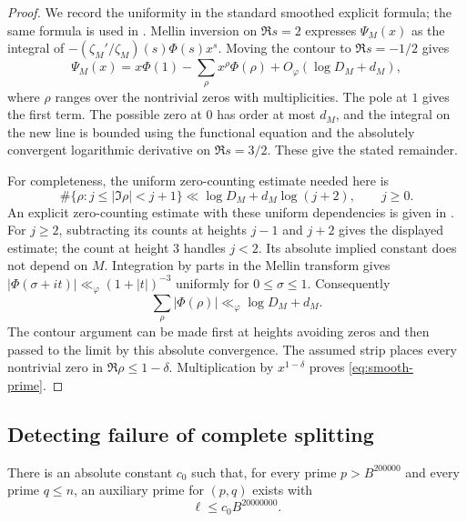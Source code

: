 \begin{proof}
We record the uniformity in the standard smoothed explicit formula;
the same formula is used in
\cite[Section~9.2, Equation~(9.9)]{OpenAIPrimitive26}.
Mellin inversion on $\Re s=2$ expresses $\Psi_M(x)$ as the integral
of $-(\zeta_M'/\zeta_M)(s)\Phi(s)x^s$. Moving the contour to
$\Re s=-1/2$ gives
\[
 \Psi_M(x)=x\Phi(1)-\sum_\rho x^\rho\Phi(\rho)
       +O_\varphi(\log D_M+d_M),
\]
where $\rho$ ranges over the nontrivial zeros with multiplicities.
The pole at $1$ gives the first term. The possible zero at $0$ has
order at most $d_M$, and the integral on the new line is bounded using
the functional equation and the absolutely convergent logarithmic
derivative on $\Re s=3/2$. These give the stated remainder.

For completeness, the uniform zero-counting estimate needed here is
\[
 \#\{\rho:j\le|\Im\rho|<j+1\}
 \ll \log D_M+d_M\log(j+2),\qquad j\ge0.
\]
An explicit zero-counting estimate with these uniform dependencies is
given in \cite[Corollary~1.2, Equation~(1.3)]{HasanalizadeShenWong22}.
For $j\ge2$, subtracting its counts at heights $j-1$ and $j+2$
gives the displayed estimate; the count at height $3$ handles $j<2$.
Its absolute implied constant does not depend on $M$.
Integration by parts in the Mellin transform
gives $|\Phi(\sigma+it)|\ll_\varphi(1+|t|)^{-3}$ uniformly for
$0\le\sigma\le1$. Consequently
\[
 \sum_\rho |\Phi(\rho)|\ll_\varphi\log D_M+d_M.
\]
The contour argument can be made first at heights avoiding zeros and
then passed to the limit by this absolute convergence. The assumed
strip places every nontrivial zero in $\Re\rho\le1-\delta$.
Multiplication by $x^{1-\delta}$ proves \eqref{eq:smooth-prime}.
\end{proof}

\subsection{Detecting failure of complete splitting}

\begin{proposition}\label{analytic:auxiliary}
There is an absolute constant $c_0$
such that, for every prime $p>B^{200000}$ and every prime $q\le n$,
an auxiliary prime for $(p,q)$ exists with
\[
 \ell\le c_0B^{20000000}.
\]
\end{proposition}

